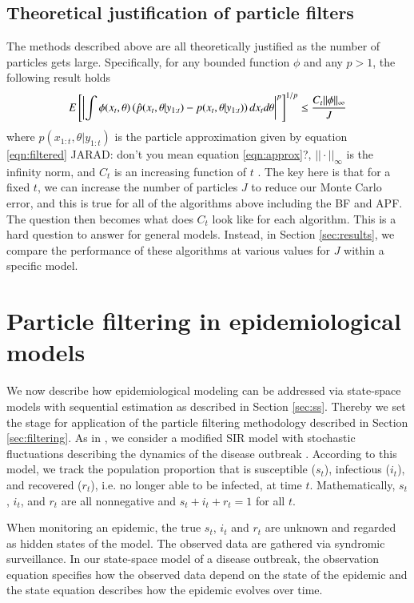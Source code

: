 \documentclass{elsarticle}
\newcommand{\jarad}[1]{{\color{red}JARAD: #1}}
\begin{document}
\subsection{Theoretical justification of particle filters}

The methods described above are all theoretically justified as the number of particles gets large. Specifically, for any bounded function $\phi$ and any $p>1$, the following result holds
\[ E\left[ \left| \int \phi (x_{t}, \theta) \left(\hat{p}(x_{t},\theta|y_{1:t})-p(x_{t},\theta|y_{1:t})\right)\emph{d}x_t\emph{d}\theta\right|^p\right]^{1/p} \le \frac{C_t ||\phi||_\infty}{J} \]
where $\hat{p}(x_{1:t},\theta|y_{1:t})$ is the particle approximation given by equation \eqref{eqn:filtered} \jarad{don't you mean equation \eqref{eqn:approx}?}, $||\cdot||_\infty$ is the infinity norm, and $C_t$ is an increasing function of $t$ \citep{del2004feynman}. The key here is that for a fixed $t$, we can increase the number of particles $J$ to reduce our Monte Carlo error, and this is true for all of the algorithms above including the BF and APF. The question then becomes what does $C_t$ look like for each algorithm. This is a hard question to answer for general models. Instead, in Section \ref{sec:results}, we compare the performance of these algorithms at various values for $J$ within a specific model.

\section{Particle filtering in epidemiological models \label{sec:apply}}

We now describe how epidemiological modeling can be addressed via state-space models with sequential estimation as described in Section \ref{sec:ss}. Thereby we set the stage for application of the particle filtering methodology described in Section \ref{sec:filtering}. As in \citet{skvortsov2012monitoring}, we consider a modified SIR model with stochastic fluctuations describing the dynamics of the disease outbreak \citep{herwaarden1995stochepid, dangerfield2009stochepid, anderson2004sars}. According to this model, we track the population proportion that is susceptible ($s_t$), infectious ($i_t$), and recovered ($r_t$), i.e. no longer able to be infected, at time $t$. Mathematically, $s_t$, $i_t$, and $r_t$ are all nonnegative and $s_t + i_t + r_t = 1$ for all $t$.

When monitoring an epidemic, the true $s_t$, $i_t$ and $r_t$ are unknown and regarded as hidden states of the model. The observed data are gathered via syndromic surveillance. In our state-space model of a disease outbreak, the observation equation specifies how the observed data depend on the state of the epidemic and the state equation describes how the epidemic evolves over time.
\end{document}
